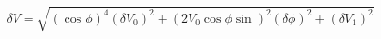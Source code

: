 \begin{equation}
\label{eq:delta_V_Malus}
\delta V = \sqrt{ \left(\cos{\phi}\right)^4(\delta V_0)^2 + \left(2V_0 \cos{\phi}\sin \right)^2(\delta \phi)^2+ (\delta V_1)^2}
\end{equation}